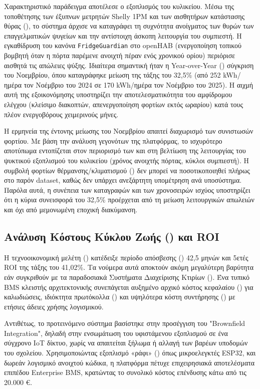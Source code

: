 Χαρακτηριστικό παράδειγμα αποτέλεσε ο εξοπλισμός του κυλικείου. Μέσω της τοποθέτησης των έξυπνων μετρητών Shelly 1PM και των αισθητήρων κατάστασης θύρας (), το σύστημα άρχισε να καταγράφει τη συχνότητα ανοίγματος των θυρών των επαγγελματικών ψυγείων και την αντίστοιχη άσκοπη λειτουργία του συμπιεστή. Η εγκαθίδρυση του κανόνα \texttt{FridgeGuardian} στο openHAB (ενεργοποίηση τοπικού βομβητή όταν η πόρτα παρέμενε ανοιχτή πέραν ενός χρονικού ορίου) περιόρισε αισθητά τις απώλειες ψύξης. Ιδιαίτερα σημαντική ήταν η Year-over-Year () σύγκριση του Νοεμβρίου, όπου καταγράφηκε μείωση της τάξης του 32,5\% (από 252 kWh/ημέρα τον Νοέμβριο του 2024 σε 170 kWh/ημέρα τον Νοέμβριο του 2025). Η αιχμή αυτή της εξοικονόμησης υποστηρίζει την αποτελεσματικότητα του αμφίδρομου ελέγχου (κλείσιμο διακοπτών, απενεργοποίηση φορτίων εκτός ωραρίου) κατά τους πλέον ενεργοβόρους χειμερινούς μήνες.

Η ερμηνεία της έντονης μείωσης του Νοεμβρίου απαιτεί διαχωρισμό των συνιστωσών φορτίου. Με βάση την ανάλυση γεγονότων της πλατφόρμας, το ισχυρότερο αποτύπωμα εντοπίζεται στον περιορισμό των  και στη βελτίωση της λειτουργίας του ψυκτικού εξοπλισμού του κυλικείου (χρόνος ανοιχτής πόρτας, κύκλοι συμπιεστή). Η συμβολή φορτίων θέρμανσης/κλιματισμού () δεν μπορεί να ποσοτικοποιηθεί πλήρως στο παρόν dataset, καθώς δεν υπάρχει ανεξάρτητη υπομέτρηση ανά υποσύστημα. Παρόλα αυτά, η συνέπεια των καταγραφών  και των χρονοσειρών ισχύος υποστηρίζει ότι η κύρια συνεισφορά του 32,5\% προέρχεται από τη μείωση λειτουργικών απωλειών και όχι από μεμονωμένη εποχική διακύμανση.

\subsection{Ανάλυση Κόστους Κύκλου Ζωής () και ROI}
Η τεχνοοικονομική μελέτη () κατέδειξε περίοδο απόσβεσης () 42,5 μηνών και 5ετές ROI της τάξης του 41,02\%. Τα νούμερα αυτά αποκτούν ακόμη μεγαλύτερη βαρύτητα εάν συγκριθούν με τα παραδοσιακά Συστήματα Διαχείρισης Κτιρίων (). Ένα τυπικό BMS κλειστής αρχιτεκτονικής συνεπάγεται αυξημένο αρχικό κόστος κεφαλαίου () για καλωδιώσεις, ιδιόκτητα πρωτόκολλα () και υψηλότερα κόστη συντήρησης () με ετήσιες άδειες χρήσης λογισμικού.

Αντιθέτως, το προτεινόμενο σύστημα βασίστηκε στην προσέγγιση του "Brownfield Integration", δηλαδή στην ενσωμάτωση του υφιστάμενου εξοπλισμού σε ένα σύγχρονο IoT δίκτυο, χωρίς να απαιτείται ξήλωμα ή αλλαγή των βαρέων υποδομών του σχολείου. Χρησιμοποιώντας εξοπλισμό «ράφι» () όπως μικροελεγκτές ESP32, και δωρεάν λογισμικό ανοιχτού κώδικα, η πλατφόρμα πέτυχε επιχειρησιακά αποτελέσματα επιπέδου Enterprise BMS, κρατώντας το συνολικό κόστος επένδυσης κάτω από τις 20.000 \euro.

